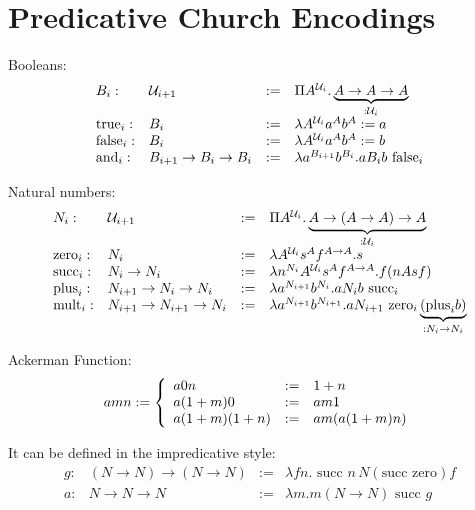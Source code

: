\section{Predicative Church Encodings}

Booleans:
$$
\begin{array}{llll}
    B_i:
    &{\cal U}_{i+1}
    &:= &
    \Pi A^{{\cal U}_i}. \underbrace{A \to A \to A}_{:{\cal U}_i} 
    \\
    \text{true}_i:
    & B_i
    &:=&
    \lambda A^{{\cal U}_i} a^A b^A := a
    \\
    \text{false}_i:
    & B_i
    &:=&
    \lambda A^{{\cal U}_i} a^A b^A := b
    \\
    \text{and}_i:
    & B_{i+1} \to B_i \to B_i
    &:=&
    \lambda a^{B_{i+1}} b^{B_i}. a B_i b \text{ false}_i
\end{array}
$$

Natural numbers:
$$
\begin{array}{llll}
    N_i:
    &{\cal U}_{i+1}
    &:= &
    \Pi A^{{\cal U}_i}. \underbrace{A \to (A \to A) \to A}_{:{\cal U}_i} 
    \\
    \text{zero}_i: & N_i &:= &\lambda A^{{\cal U}_i} s^A f^{A \to A}. s
    \\
    \text{succ}_i: & N_i \to N_i &:= &
    \lambda n^{N_i} A^{{\cal U}_i} s^A f^{A \to A}. f (n A s f)
    \\
    \text{plus}_i:
    & N_{i+1} \to N_i \to N_i
    &:=&
    \lambda a^{N_{i+1}} b^{N_i}. a N_i b \text{ succ}_i
    \\
    \text{mult}_i:
    & N_{i+1} \to N_{i+1} \to N_i
    &:=&
    \lambda a^{N_{i+1}} b^{N_{i+1}}
    . a N_{i+1} \text{ zero}_i \underbrace{(\text{plus}_i b)}_{: N_i \to N_i}
\end{array}
$$


Ackerman Function:
$$
a m n :=
\left\{ \begin{array}{llll} 
a 0 n &:=& 1 + n
\\
a (1+m) 0 &:=& a m 1
\\
a (1+m) (1+n) &:=& a m (a (1+m) n)
 \end{array} \right.
$$

It can be defined in the impredicative style:
$$
\begin{array}{llll}
    g:
    & (N \to N) \to (N \to N)
    &:=&
    \lambda f n. \text{ succ } n\, N (\text{succ zero}) f
    \\
    a: & N \to N \to N
    &:=&
    \lambda m. m (N \to N) \text{ succ } g
\end{array}
$$
